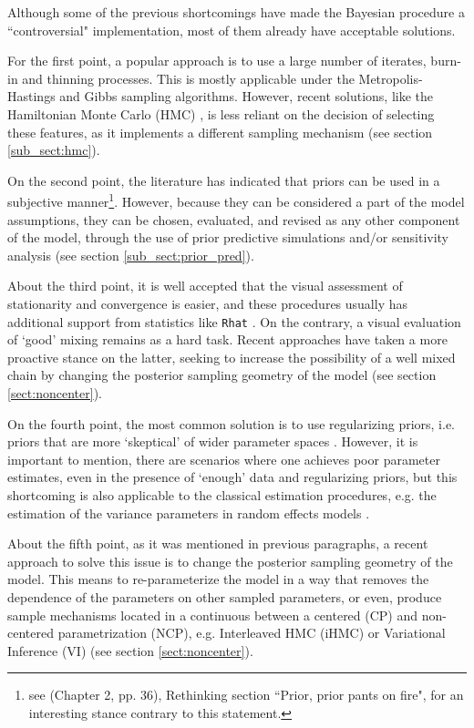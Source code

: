 Although some of the previous shortcomings have made the Bayesian procedure a ``controversial" implementation, most of them already have acceptable solutions. 

For the first point, a popular approach is to use a large number of iterates, burn-in and thinning processes. This is mostly applicable under the Metropolis-Hastings and Gibbs sampling algorithms. However, recent solutions, like the Hamiltonian Monte Carlo (HMC) \cite{Betancourt_et_al_2013}, is less reliant on the decision of selecting these features, as it implements a different sampling mechanism (see section \ref{sub_sect:hmc}). 

On the second point, the literature has indicated that priors can be used in a subjective manner\footnote{see \citet{McElreath_2020} (Chapter 2, pp. 36), Rethinking section ``Prior, prior pants on fire", for an interesting stance contrary to this statement.}. However, because they can be considered a part of the model assumptions, they can be chosen, evaluated, and revised as any other component of the model, through the use of prior predictive simulations and/or sensitivity analysis \cite{McElreath_2020} (see section \ref{sub_sect:prior_pred}).

About the third point, it is well accepted that the visual assessment of stationarity and convergence is easier, and these procedures usually has additional support from statistics like \texttt{Rhat} \cite{Gelman_et_al_2014}. On the contrary, a visual evaluation of `good' mixing remains as a hard task. Recent approaches have taken a more proactive stance on the latter, seeking to increase the possibility of a well mixed chain by changing the posterior sampling geometry of the model \cite{Papaspiliopoulos_et_al_2003, Papaspiliopoulos_et_al_2007, Betancourt_et_al_2013, McElreath_2020} (see section \ref{sect:noncenter}).

On the fourth point, the most common solution is to use regularizing priors, i.e. priors that are more `skeptical' of wider parameter spaces \cite{McElreath_2020}. However, it is important to mention, there are scenarios where one achieves poor parameter estimates, even in the presence of `enough' data and regularizing priors, but this shortcoming is also applicable to the classical estimation procedures, e.g. the estimation of the variance parameters in random effects models \cite{Skrondal_et_al_2004a}.

About the fifth point, as it was mentioned in previous paragraphs, a recent approach to solve this issue is to change the posterior sampling geometry of the model. This means to re-parameterize the model in a way that removes the dependence of the parameters on other sampled parameters, or even, produce sample mechanisms located in a continuous between a centered (CP) and non-centered parametrization (NCP), e.g. Interleaved HMC (iHMC) or Variational Inference (VI) \cite{Gelfand_et_al_1995, Gelfand_et_al_1996, Papaspiliopoulos_et_al_2003, Papaspiliopoulos_et_al_2007, Betancourt_et_al_2013, Gorinova_et_al_2019} (see section \ref{sect:noncenter}).

